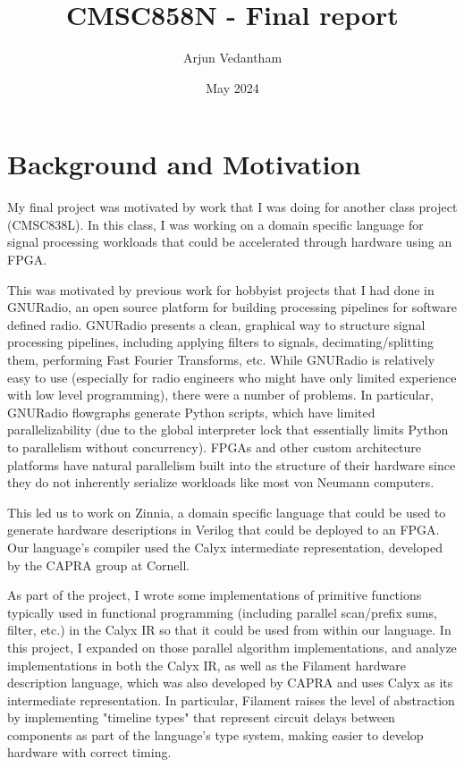 \documentclass[12pt]{article}
\title{CMSC858N - Final report}
\author{Arjun Vedantham}
\date{May 2024}
\begin{document}
\maketitle
\section{Background and Motivation}
My final project was motivated by work that I was doing for another class project (CMSC838L).
In this class, I was working on a domain specific language for signal processing workloads
that could be accelerated through hardware using an FPGA.

This was motivated by previous work for hobbyist projects that I had done in GNURadio, an open source
platform for building processing pipelines for software defined radio. GNURadio presents a clean,
graphical way to structure signal processing pipelines, including applying filters to signals,
decimating/splitting them, performing Fast Fourier Transforms, etc. While GNURadio is relatively easy
to use (especially for radio engineers who might have only limited experience with low level programming),
there were a number of problems. In particular, GNURadio flowgraphs generate Python scripts, which have limited
parallelizability (due to the global interpreter lock that essentially limits Python to parallelism without
concurrency). FPGAs and other custom architecture platforms have natural parallelism built into the structure
of their hardware since they do not inherently serialize workloads like most von Neumann computers.

This led us to work on Zinnia, a domain specific language that could be used to generate
hardware descriptions in Verilog that could be deployed to an FPGA. Our language's compiler used
the Calyx intermediate representation, developed by the CAPRA group at Cornell.

As part of the project, I wrote some implementations of primitive functions typically used in functional
programming (including parallel scan/prefix sums, filter, etc.) in the Calyx IR so that it could be used from within our language.
In this project, I expanded on those parallel algorithm implementations, and analyze implementations
in both the Calyx IR, as well as the Filament hardware description language, which was also developed by CAPRA
and uses Calyx as its intermediate representation. In particular, Filament raises the level of abstraction by
implementing "timeline types" that represent circuit delays between components as part of the language's
type system, making easier to develop hardware with correct timing.
\end{document}
